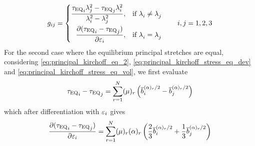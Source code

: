 \begin{equation}
    g_{ij} = \begin{cases}
        \begin{aligned}
            \dfrac{{{\tau}_{\text{EQ}}}_{i} \lambda^{2}_{{j}} 
            -  {{\tau}_{\text{EQ}}}_{j} \lambda^{2}_{{i}}}
            {\lambda^{2}_{{i}} 
            -  \lambda^{2}_{{j}}},              
            && \text{if } \lambda^{}_{{i}} \neq \lambda^{}_{{j}}\\
            \pdv{({{\tau}_{\text{EQ}}}_{i}- {{\tau}_{\text{EQ}}}_{j})}{\varepsilon_{{i}}},              
            && \text{if } \lambda^{}_{{i}} = \lambda^{}_{{j}}
        \end{aligned}
    \end{cases}
    \quad i,j=1,2,3
    \label{eq:g_ij}
\end{equation}
For the second case where the equilibrium principal stretches are equal, considering \cref{eq:principal_kirchoff_eq_2}, \cref{eq:principal_kirchoff_stress_eq_dev} and \cref{eq:principal_kirchoff_stress_eq_vol}, we first evaluate
\begin{equation}
    {{\tau}_{\text{EQ}}}_{i} - {{\tau}_{\text{EQ}}}_{j}
    = \sum_{r=1}^{N} (\mu)_{r} \left( \overline{b}_{{i}}^{(\alpha)_{r}/2} - \overline{b}_{{j}}^{(\alpha)_{r}/2} \right)
\end{equation}
which after differentiation with \(\varepsilon_{{i}}\) gives
\begin{equation}
    \pdv{({{\tau}_{\text{EQ}}}_{i}- {{\tau}_{\text{EQ}}}_{j})}{\varepsilon_{{i}}} 
    = \sum_{r=1}^{N} (\mu)_{r} (\alpha)_{r} 
    \left( \frac{2}{3}\overline{b}_{{i}}^{(\alpha)_{r}/2} 
    + \frac{1}{3}\overline{b}_{{j}}^{(\alpha)_{r}/2} \right) 
    \label{eq:g_ij_equalstretch}
\end{equation}

